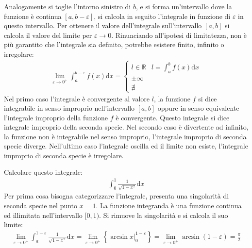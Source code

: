\documentclass{article}
\numberwithin{equation}{subsection}
\begin{document}
Analogamente si toglie l'intorno sinistro di $b$, e si forma un'intervallo dove la funzione è continua $[a, b-\varepsilon]$, si calcola in seguito l'integrale in funzione di $\varepsilon$ in questo intervallo. Per ottenere il valore dell'integrale sull'intervallo $[a,b]$ si calcola il valore del limite per $\varepsilon\to0$. 
Rinunciando all'ipotesi di limitatezza, non è più garantito che l'integrale sia definito, potrebbe esistere finito, infinito o irregolare:
\begin{gather*}
    \lim_{\varepsilon\to0^+}\displaystyle\int_a^{b-\varepsilon}f(x)\mathrm{d}x=
    \begin{cases}
        l\in\mathbb{R} &l=\displaystyle\int_a^bf(x)\mathrm{d}x\\
        \pm\infty&\\
        \nexists&
    \end{cases}
\end{gather*}
Nel primo caso l'integrale è convergente al valore $l$, la funzione $f$ si dice integrabile in senso improprio nell'intervallo $[a,b]$ oppure in senso equivalente l'integrale improprio della funzione $f$ è convergente. Questo integrale si dice integrale improprio della seconda specie. Nel secondo caso è divertente ad infinito, la funzione non è integrabile nel senso improprio, l'integrale improprio di seconda specie diverge. Nell'ultimo caso l'integrale oscilla ed il limite non esiste, l'integrale improprio di seconda specie è irregolare. 


Calcolare questo integrale:
\begin{gather*}
    \displaystyle\int_0^1\frac{1}{\sqrt{1-x^2}}\mathrm{d}x
\end{gather*}
Per prima cosa bisogna categorizzare l'integrale, presenta una singolarità di seconda specie nel punto $x=1$. La funzione integranda è una funzione continua ed illimitata nell'intervallo $[0,1)$. 
Si rimuove la singolarità e si calcola il suo limite:
\begin{gather*}
    \lim_{\varepsilon\to0^+}\displaystyle\int_a^{1-\varepsilon}\frac{1}{\sqrt{1-x^2}}\mathrm{d}x=\lim_{\varepsilon\to0^+}\left\{\arcsin x\bigg|_0^{1-\varepsilon}\right\}=\lim_{\varepsilon\to0^+}\arcsin(1-\varepsilon)=\frac{\pi}{2}
\end{gather*}
\end{document}
